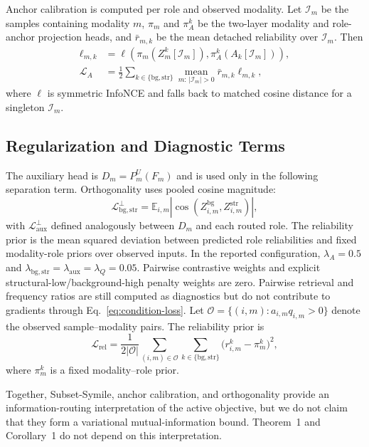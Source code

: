\documentclass[letterpaper]{article}
\begin{document}
Anchor calibration is computed per role and observed modality. Let $\mathcal I_m$ be the samples containing modality $m$, $\pi_m$ and $\pi_A^k$ be the two-layer modality and role-anchor projection heads, and $\bar r_{m,k}$ be the mean detached reliability over $\mathcal I_m$. Then
\begin{align}
\ell_{m,k}
&=\ell\!\left(\pi_m(Z_m^k[\mathcal I_m]),
\pi_A^k(A_k[\mathcal I_m])\right),\\
\mathcal L_A
&=\frac{1}{2}\sum_{k\in\{\mathrm{bg},\mathrm{str}\}}
\operatorname*{mean}_{m:\,|\mathcal I_m|>0}
\bar r_{m,k}\ell_{m,k},
\end{align}
where $\ell$ is symmetric InfoNCE and falls back to matched cosine distance for a singleton $\mathcal I_m$.

\subsection{Regularization and Diagnostic Terms}
The auxiliary head is $D_m=P_m^U(F_m)$ and is used only in the following separation term. Orthogonality uses pooled cosine magnitude:
\begin{equation}
\mathcal L_{\mathrm{bg,str}}^{\perp}
=\mathbb E_{i,m}|\cos(Z_{i,m}^{\mathrm{bg}},Z_{i,m}^{\mathrm{str}})|,
\end{equation}
with $\mathcal L_{\mathrm{aux}}^{\perp}$ defined analogously between $D_m$ and each routed role. The reliability prior is the mean squared deviation between predicted role reliabilities and fixed modality-role priors over observed inputs. In the reported configuration, $\lambda_A=0.5$ and $\lambda_{\mathrm{bg,str}}=\lambda_{\mathrm{aux}}=\lambda_Q=0.05$. Pairwise contrastive weights and explicit structural-low/background-high penalty weights are zero. Pairwise retrieval and frequency ratios are still computed as diagnostics but do not contribute to gradients through Eq.~\ref{eq:condition-loss}. Let $\mathcal O=\{(i,m):a_{i,m}q_{i,m}>0\}$ denote the observed sample--modality pairs. The reliability prior is
\begin{equation}
\mathcal L_{\mathrm{rel}}
 =\frac{1}{2|\mathcal O|}
 \sum_{(i,m)\in\mathcal O}
 \sum_{k\in\{\mathrm{bg},\mathrm{str}\}}
 \bigl(r_{i,m}^k-\pi_m^k\bigr)^2,
\end{equation}
where $\pi_m^k$ is a fixed modality--role prior.

Together, Subset-Symile, anchor calibration, and orthogonality provide an information-routing interpretation of the active objective, but we do not claim that they form a variational mutual-information bound. Theorem~1 and Corollary~1 do not depend on this interpretation.
\end{document}

